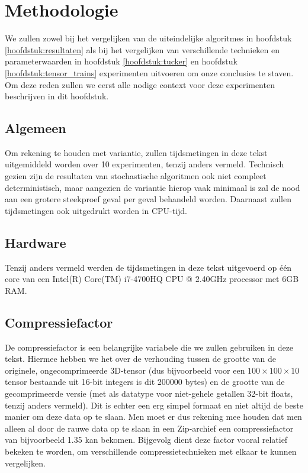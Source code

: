 \chapter{Methodologie}
\label{hoofdstuk:methodologie}

We zullen zowel bij het vergelijken van de uiteindelijke algoritmes in hoofdstuk \ref{hoofdstuk:resultaten} als bij het vergelijken van verschillende technieken en parameterwaarden in hoofdstuk \ref{hoofdstuk:tucker} en hoofdstuk \ref{hoofdstuk:tensor_trains} experimenten uitvoeren om onze conclusies te staven. Om deze reden zullen we eerst alle nodige context voor deze experimenten beschrijven in dit hoofdstuk.

\section{Algemeen}
Om rekening te houden met variantie, zullen tijdsmetingen in deze tekst uitgemiddeld worden over 10 experimenten, tenzij anders vermeld. Technisch gezien zijn de resultaten van stochastische algoritmen ook niet compleet deterministisch, maar aangezien de variantie hierop vaak minimaal is zal de nood aan een grotere steekproef geval per geval behandeld worden. Daarnaast zullen tijdsmetingen ook uitgedrukt worden in CPU-tijd.

\section{Hardware}
Tenzij anders vermeld werden de tijdsmetingen in deze tekst uitgevoerd op \'e\'en core van een Intel(R) Core(TM) i7-4700HQ CPU @ 2.40GHz processor met 6GB RAM.

\section{Compressiefactor}

De compressiefactor is een belangrijke variabele die we zullen gebruiken in deze tekst. Hiermee hebben we het over de verhouding tussen de grootte van de originele, ongecomprimeerde 3D-tensor (dus bijvoorbeeld voor een $100 \times 100 \times 10$ tensor bestaande uit 16-bit integers is dit 200000 bytes) en de grootte van de gecomprimeerde versie (met als datatype voor niet-gehele getallen 32-bit floats, tenzij anders vermeld). Dit is echter een erg simpel formaat en niet altijd de beste manier om deze data op te slaan. Men moet er dus rekening mee houden dat men alleen al door de rauwe data op te slaan in een Zip-archief een compressiefactor van bijvoorbeeld 1.35 kan bekomen. Bijgevolg dient deze factor vooral relatief bekeken te worden, om verschillende compressietechnieken met elkaar te kunnen vergelijken.\\

